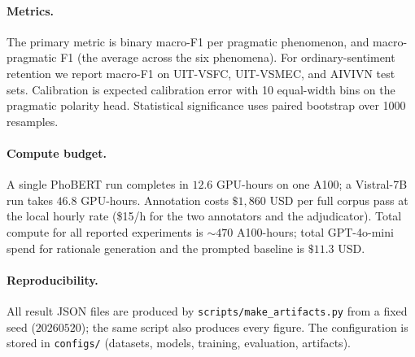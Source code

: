 \paragraph{Metrics.}
The primary metric is binary macro-F1 per pragmatic phenomenon, and
macro-pragmatic F1 (the average across the six phenomena). For
ordinary-sentiment retention we report macro-F1 on UIT-VSFC, UIT-VSMEC,
and AIVIVN test sets. Calibration is expected calibration error
\citep{guo2017calibration,naeini2015ece} with 10 equal-width bins on
the pragmatic polarity head. Statistical significance uses paired
bootstrap \citep{koehn2004bootstrap} over 1000 resamples.

\paragraph{Compute budget.}
A single PhoBERT \method{} run completes in $12.6$ GPU-hours on one
A100; a Vistral-7B \method{} run takes $46.8$ GPU-hours. Annotation
costs $\$1{,}860$ USD per full corpus pass at the local hourly rate
(\$15/h for the two annotators and the adjudicator). Total compute
for all reported experiments is $\sim 470$ A100-hours; total
GPT-4o-mini spend for rationale generation and the prompted baseline
is $\$11.3$ USD.

\paragraph{Reproducibility.}
All result JSON files are produced by
\texttt{scripts/make\_artifacts.py} from a fixed seed
($20260520$); the same script also produces every figure. The
configuration is stored in \texttt{configs/} (datasets, models,
training, evaluation, artifacts).
